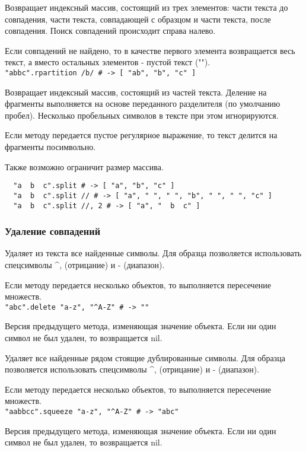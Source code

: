 \begin{methodlist}
  Возвращает индексный массив, состоящий из трех элементов: части текста до совпадения, части текста, совпадающей с образцом и части текста, после совпадения. Поиск совпадений происходит справа налево.

  Если совпадений не найдено, то в качестве первого элемента возвращается весь текст, а вместо остальных элементов - пустой текст ("").
  \\\verb!"abbc".rpartition /b/ # -> [ "ab", "b", "c" ]!

  Возвращает индексный массив, состоящий из частей текста. Деление на фрагменты выполняется на основе переданного разделителя (по умолчанию пробел). Несколько пробельных символов в тексте при этом игнорируются.

  Если методу передается пустое регулярное выражение, то текст делится на фрагменты посимвольно.

  Также возможно ограничит размер массива.
  \begin{verbatim}
  "a  b  c".split # -> [ "a", "b", "c" ]
  "a  b  c".split // # -> [ "a", " ", " ", "b", " ", " ", "c" ]
  "a  b  c".split //, 2 # -> [ "a", "  b  c" ]
  \end{verbatim}
\end{methodlist}

\subsubsection*{Удаление совпадений}

\begin{methodlist}
  Удаляет из текста все найденные символы. Для образца позволяется использовать спецсимволы \textasciicircum\-, (отрицание) и - (диапазон).

  Если методу передается несколько объектов, то выполняется пересечение множеств. 
  \\\verb!"abc".delete "a-z", "^A-Z" # -> ""!

  Версия предыдущего метода, изменяющая значение объекта. Если ни один символ не был удален, то возвращается nil.

  Удаляет все найденные рядом стоящие дублированные символы. Для образца позволяется использовать спецсимволы \textasciicircum\-, (отрицание) и - (диапазон).

  Если методу передается несколько объектов, то выполняется пересечение множеств.
  \\\verb!"aabbcc".squeeze "a-z", "^A-Z" # -> "abc"!

  Версия предыдущего метода, изменяющая значение объекта. Если ни один символ не был удален, то возвращается nil.
\end{methodlist}

